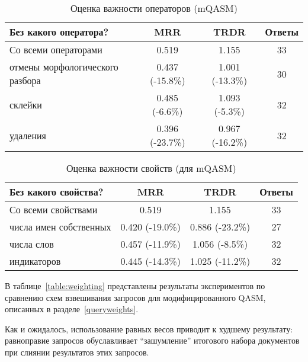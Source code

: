 \documentclass{article}
\begin{document}
\begin{table*}[bt]
\begin{center}
\begin{tabular}{|l|c|c|c|}
\hline
Без какого оператора? & MRR & TRDR & Ответы \\
\hline
\hline
Со всеми операторами & 0.519 & 1.155 & 33 \\
 отмены морфологического разбора & 0.437 (-15.8\%)  & 1.001 (-13.3\%) & 30 \\
 склейки & 0.485 (-6.6\%) & 1.093 (-5.3\%) & 32 \\
 удаления & 0.396 (-23.7\%) & 0.967 (-16.2\%) & 32 \\
\hline
\end{tabular}
\caption{Оценка важности операторов (mQASM)}
\label{table:operators}
\end{center}
\end{table*}

\begin{table*}[tb]
\begin{center}
\begin{tabular}{|l|c|c|c|}
\hline
Без какого свойства? & MRR & TRDR & Ответы \\
\hline
\hline
Со всеми свойствами & 0.519 & 1.155 & 33 \\
 числа имен собственных & 0.420 (-19.0\%) & 0.886 (-23.2\%) & 27 \\
 числа слов & 0.457 (-11.9\%) & 1.056 (-8.5\%) & 32 \\
 индикаторов & 0.445 (-14.3\%) & 1.025 (-11.2\%) & 32 \\
\hline
\end{tabular}
\caption{Оценка важности свойств (для mQASM)}
\label{table:props}
\end{center}
\end{table*}


В таблице~\ref{table:weighting} представлены результаты экспериментов по
сравнению схем взвешивания запросов для модифицированного QASM,
описанных в разделе~\ref{queryweights}.

Как и ожидалось, использование равных весов приводит к худшему результату:
равноправие запросов обуславливает ``зашумление'' итогового набора
документов при слиянии результатов этих запросов.
\end{document}

